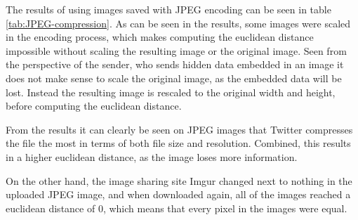 The results of using images saved with JPEG encoding can be seen in table \ref{tab:JPEG-compression}.
As can be seen in the results, some images were scaled in the encoding process, which makes computing the euclidean distance impossible without scaling the resulting image or the original image.
Seen from the perspective of the sender, who sends hidden data embedded in an image it does not make sense to scale the original image, as the embedded data will be lost.
Instead the resulting image is rescaled to the original width and height, before computing the euclidean distance.

From the results it can clearly be seen on JPEG images that Twitter compresses the file the most in terms of both file size and resolution.
Combined, this results in a higher euclidean distance, as the image loses more information.

On the other hand, the image sharing site Imgur changed next to nothing in the uploaded JPEG image, and when downloaded again, all of the images reached a euclidean distance of 0, which means that every pixel in the images were equal.

